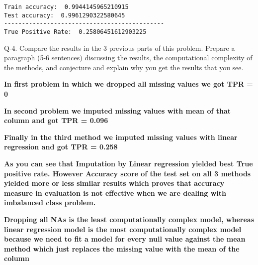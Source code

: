\documentclass[11pt]{article}
\begin{document}
    \begin{Verbatim}[commandchars=\\\{\}]
Train accuracy:  0.9944145965210915
Test accuracy:  0.9961290322580645
---------------------------------------------
True Positive Rate:  0.25806451612903225

    \end{Verbatim}

    Q-4. Compare the results in the 3 previous parts of this problem.
Prepare a paragraph (5-6 sentences) discussing the results, the
computational complexity of the methods, and conjecture and explain why
you get the results that you see.

    \textbf{In first problem in which we dropped all missing values we got
TPR = 0}

\textbf{In second problem we imputed missing values with mean of that
column and got TPR = 0.096}

\textbf{Finally in the third method we imputed missing values with
linear regression and got TPR = 0.258}

\textbf{As you can see that Imputation by Linear regression yielded best
True positive rate. However Accuracy score of the test set on all 3
methods yielded more or less similar results which proves that accuracy
measure in evaluation is not effective when we are dealing with
imbalanced class problem.}

\textbf{Dropping all NAs is the least computationally complex model,
whereas linear regression model is the most computationally complex
model because we need to fit a model for every null value against the
mean method which just replaces the missing value with the mean of the
column}


    
    
    
    
\end{document}
